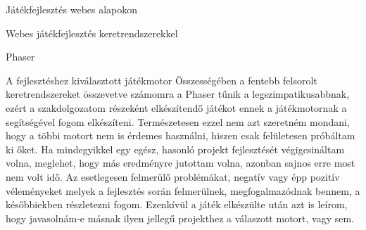 \begin{MyChapter}{Játékfejlesztés webes alapokon}
\begin{MySection}{Webes játékfejlesztés keretrendszerekkel}
\begin{MySubSection}{Phaser}
		\end{MySubSection}
			
		\begin{MySubSection}{A fejlesztéshez kiválasztott játékmotor}		
			Összességében a fentebb felsorolt keretrendszereket összevetve számomra a Phaser tűnik a legszimpatikusabbnak, ezért a szakdolgozatom részeként elkészítendő játékot ennek a játékmotornak a segítségével fogom elkészíteni. Természetesen ezzel nem azt szeretném mondani, hogy a többi motort nem is érdemes használni, hiszen csak felületesen próbáltam ki őket. Ha mindegyikkel egy egész, hasonló projekt fejlesztését végigcsináltam volna, meglehet, hogy más eredményre jutottam volna, azonban sajnos erre most nem volt idő.
			Az esetlegesen felmerülő problémákat, negatív vagy épp pozitív véleményeket melyek a fejlesztés során felmerülnek, megfogalmazódnak bennem, a későbbiekben részletezni fogom. Ezenkívül a játék elkészülte után azt is leírom, hogy javasolnám-e másnak ilyen jellegű projekthez a válaszott motort, vagy sem.
		\end{MySubSection}

	\end{MySection}
	
\end{MyChapter}